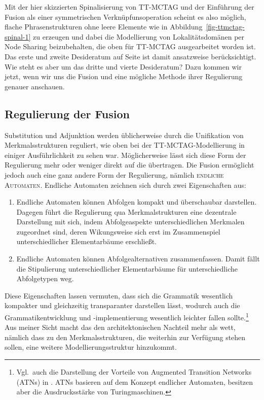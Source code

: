 Mit der hier skizzierten Spinalisierung von TT-MCTAG und der Einführung der Fusion als einer symmetrischen Verknüpfunsoperation scheint es also möglich, flache Phrasenstrukturen ohne leere Elemente wie in Abbildung~\ref{fig-ttmctag-spinal-1} zu erzeugen und dabei die Modellierung von Lokalitätsdomänen per Node Sharing  beizubehalten, die oben für TT-MCTAG ausgearbeitet worden ist. Das erste und zweite Desideratum auf Seite \pageref{enum-ttmctag-spinal} ist damit ansatzweise berücksichtigt. Wie steht es aber um das dritte und vierte Desideratum? Dazu kommen wir jetzt, wenn wir uns die Fusion und eine mögliche Methode ihrer Regulierung genauer anschauen.   
 

\subsection{Regulierung der Fusion}

Substitution und Adjunktion werden üblicherweise durch die Unifikation von Merkmalsstrukturen reguliert, wie oben bei der TT-MCTAG-Modellierung in einiger Ausführlichkeit zu sehen war. Möglicherweise lässt sich diese Form der Regulierung mehr oder weniger direkt auf die  übertragen. Die Fusion ermöglicht jedoch auch eine ganz andere Form der Regulierung, nämlich \textsc{endliche Automaten}. Endliche Automaten zeichnen sich durch zwei Eigenschaften aus:

\begin{enumerate}
  \item Endliche Automaten können Abfolgen kompakt und überschaubar darstellen. Dagegen führt die Regulierung qua Merkmalstrukturen eine dezentrale Darstellung mit sich, indem Abfolgeaspekte unterschiedlichen Merkmalen zugeordnet sind, deren Wikungsweise sich erst im Zusammenspiel unterschiedlicher Elementarbäume erschlie\ss t.
\item Endliche Automaten können Abfolgealternativen zusammenfassen. Damit fällt die Stipulierung unterschiedlicher Elementarbäume für unterschiedliche Abfolgetypen weg. 
\end{enumerate}

Diese Eigenschaften lassen vermuten, dass sich die Grammatik wesentlich kompakter und gleichzeitig transparanter darstellen lässt, wodurch auch die Grammatikentwicklung und -implementierung wesentlich leichter fallen sollte.\footnote{Vgl.\ auch die Darstellung der Vorteile von Augmented Transition Networks (ATNs) in \citet[599ff]{Woods:70}. ATNs basieren auf dem Konzept endlicher Automaten, besitzen aber die Ausdrucksstärke von Turingmaschinen.} 
Aus meiner Sicht macht das den architektonischen Nachteil mehr als wett, nämlich dass zu den Merkmalsstrukturen, die weiterhin zur Verfügung stehen sollen, eine weitere Modellierungsstruktur hinzukommt. 

